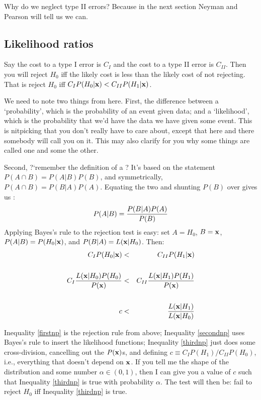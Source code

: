 Why do we neglect type II errors? Because in the next section Neyman
and Pearson will tell us we can.

\subsection{Likelihood ratios} 

Say the cost to a type I error is $C_I$ and the cost to a type II error is $C_{II}$.
Then you will reject $H_0$ iff the likely cost is less than the likely cost of not
rejecting. That is reject $H_0$ iff $C_I P(H_0|{\bf x})<C_{II} P(H_1|{\bf x})$.

We need to note two things from here. First, the difference between a `probability',
which is the probability of an event given data; and a `likelihood', which is the
probability that we'd have the data we have given some event. This is nitpicking that
you don't really have to care about, except that here and there somebody will call you
on it. This may also clarify for you why some things are called one and some the
other.

Second, ?`remember the definition of a ? It's based on the
statement $P(A\cap B)=P(A|B)P(B)$, and symmetrically, $P(A\cap B)=P(B|A)P(A)$.  Equating
the two and shunting $P(B)$ over gives us : $$P(A|B)={P(B|A) P(A)\over P(B)}$$
Applying Bayes's rule to the rejection test is easy: set $A=H_0$, $B={\bf x}$,
$P(A|B)=P(H_0|{\bf x})$, and $P(B|A)=L({\bf x}|H_0)$. Then:
\begin{eqnarray}
C_I P(H_0|{\bf x})&<&C_{II} P(H_1|{\bf x})\label{firstnp}\\
\nonumber\\
C_I {L({\bf x}|H_0)P(H_0)\over P({\bf x})}&<& C_{II} {L({\bf x}|H_1)P(H_1)\over P({\bf x})}\label{secondnp}\\
\nonumber\\
c&<& {L({\bf x}|H_1)\over L({\bf x}|H_0)}\label{thirdnp}
\end{eqnarray}

Inequality \ref{firstnp} is the rejection rule from above; Inequality
\ref{secondnp} uses Bayes's rule to insert the likelihood functions;
Inequality \ref{thirdnp} just does some cross-division, cancelling out the
$P({\bf x})$s, and defining $c\equiv C_IP(H_1)/C_{II}P(H_0)$, i.e., everything
that doesn't depend on ${\bf x}$. If you tell me the shape of the distribution
and some number $\alpha\in(0,1)$, then I can give you a value of $c$
such that Inequality \ref{thirdnp} is true with probability
$\alpha$. The test will then be: fail to reject $H_0$ iff Inequality
\ref{thirdnp} is true.

